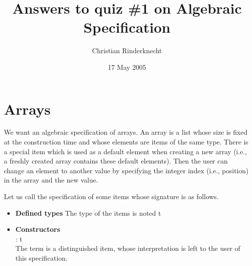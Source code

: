\documentclass[11pt,a4paper]{article}
\title{Answers to quiz \#1 on Algebraic Specification}
\author{Christian Rinderknecht}
\date{17 May 2005}
\newcommand\type[1]{\textsf{#1}}
\begin{document}
\maketitle

\section{Arrays}

We want an algebraic specification of arrays. An array is a list whose
size is fixed at the construction time and whose elements are items of
the same type. There is a special item which is used as a default
element when creating a new array (i.e., a freshly created array
contains these default elements). Then the user can change an element
to another value by specifying the integer index (i.e., position) in
the array and the new value.

\noindent Let us call  the specification of some items whose
signature is as follows.
\begin{itemize}

   \item \textbf{Defined types}
   The type of the items is noted \type{t}

   \item \textbf{Constructors}\\  : \type{t}\\ The term
      is a distinguished item, whose interpretation is
     left to the user of this specification.

\end{itemize}
\end{document}
